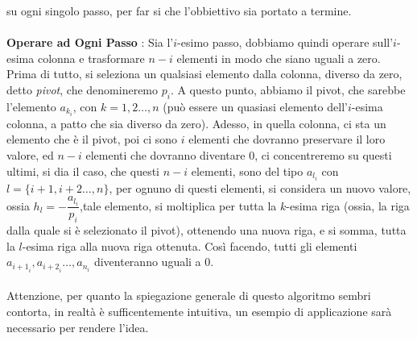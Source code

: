 \documentclass[12pt, letterpaper]{article}
\newcommand{\acc}{\\\hphantom{}\\}
\begin{document}
su ogni singolo passo, per far si che l'obbiettivo sia portato a termine.\acc 
\textbf{Operare ad Ogni Passo} : Sia l'\(i\)-esimo passo, dobbiamo quindi operare sull'\(i\)-esima colonna 
e trasformare \(n-i\) elementi in modo che siano uguali a zero. Prima di tutto, si seleziona un qualsiasi
elemento dalla colonna, diverso da zero, detto \textit{pivot}, che denomineremo \(p_i\).
A questo punto, abbiamo il pivot, che sarebbe l'elemento \(a_{k_i}\), con \(k={1,2\dots, n}\) (può essere un 
quasiasi elemento dell'\(i\)-esima colonna, a patto che sia diverso da zero). Adesso, in quella colonna, 
ci sta un elemento che è il pivot, poi ci sono \(i\) elementi che dovranno preservare il loro valore, 
ed \(n-i\) elementi che dovranno diventare 0, ci concentreremo su questi ultimi, si dia il caso, che 
questi \(n-i\) elementi, sono del tipo \(a_{l_i}\) con \(l=\{i+1,i+2\dots,n\}\), per ognuno di questi 
elementi, si considera un nuovo valore, ossia \(h_l=-\dfrac{a_{l_i}}{p_i}\),tale elemento, si moltiplica 
per tutta la \(k\)-esima riga (ossia, la riga dalla quale si è selezionato il pivot), ottenendo una nuova riga, e si somma, tutta la 
\(l\)-esima riga alla nuova riga ottenuta. Così facendo,  tutti gli elementi \(a_{{i+1}_i},a_{{i+2}_i}\dots,a_{{n}_i}\) 
diventeranno uguali a 0.\acc 
Attenzione, per quanto la spiegazione generale di questo algoritmo sembri contorta, in realtà è sufficentemente 
intuitiva, un esempio di applicazione sarà necessario per rendere l'idea.
\end{document}
